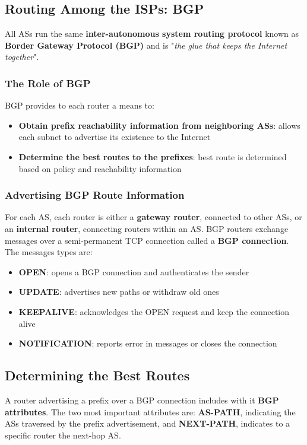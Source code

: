 \documentclass{article}
\begin{document}
\subsection{Routing Among the ISPs: BGP}
All ASs run the same \textbf{inter-autonomous system routing protocol} known as \textbf{Border Gateway Protocol (BGP)} and is "\emph{the glue that keeps the Internet together}".
\subsubsection{The Role of BGP}
BGP provides to each router a means to:
\begin{itemize}
    \item \textbf{Obtain prefix reachability information from neighboring ASs}: allows each subnet to advertise its existence to the Internet
    \item \textbf{Determine the best routes to the prefixes}: best route is determined based on policy and reachability information
\end{itemize}
\subsubsection{Advertising BGP Route Information}
For each AS, each router is either a \textbf{gateway router}, connected to other ASs, or an \textbf{internal router}, connecting routers within an AS.
BGP routers exchange messages over a semi-permanent TCP connection called a \textbf{BGP connection}.
The messages types are:
\begin{itemize}
    \item \textbf{OPEN}: opens a BGP connection and authenticates the sender
    \item \textbf{UPDATE}: advertises new paths or withdraw old ones
    \item \textbf{KEEPALIVE}: acknowledges the OPEN request and keep the connection alive
    \item \textbf{NOTIFICATION}: reports error in messages or closes the connection
\end{itemize}
\subsection{Determining the Best Routes}
A router advertising a prefix over a BGP connection includes with it \textbf{BGP attributes}. The two most important attributes are: \textbf{AS-PATH}, indicating the ASs traversed by the prefix advertisement, and \textbf{NEXT-PATH}, indicates to a specific router the next-hop AS.
\end{document}
